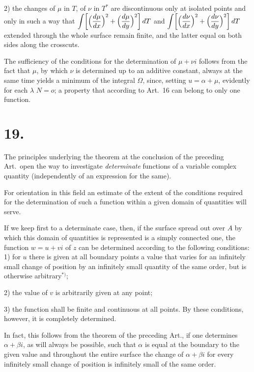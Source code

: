 \documentclass{article}
\begin{document}
2) the changes of $\mu$ in $T$, of $\nu$ in $T^*$ are discontinuous only at isolated points and only in such a way that $\displaystyle\int \biggl[\Bigl(\frac{d\mu}{dx}\Bigr)^2 + \Bigl(\frac{d\mu}{dy}\Bigr)^2\biggr]\,dT$ and $\displaystyle\int \biggl[\Bigl(\frac{d\nu}{dx}\Bigr)^2 + \Bigl(\frac{d\nu}{dy}\Bigr)^2\biggr]\,dT$ extended through the whole surface remain finite, and the latter equal on both sides along the crosscuts.

The sufficiency of the conditions for the determination of $\mu + \nu i$ follows from the fact that $\mu$, by which $\nu$ is determined up to an additive constant, always at the same time yields a minimum of the integral $\Omega$, since, setting $u = \alpha + \mu$, evidently for each $\lambda$ $N = o$; a property that according to Art.~16 can belong to only one function.

\section*{19.}

The principles underlying the theorem at the conclusion of the preceding Art.\ open the way to investigate \emph{determinate} functions of a variable complex quantity (independently of an expression for the same).

For orientation in this field an estimate of the extent of the conditions required for the determination of such a function within a given domain of quantities will serve.

If we keep first to a determinate case, then, if the surface spread out over $A$ by which this domain of quantities is represented is a simply connected one, the function $w = u + vi$ of $z$ can be determined according to the following conditions:
1) for $u$ there is given at all boundary points a value that varies for an infinitely small change of position by an infinitely small quantity of the same order, but is otherwise arbitrary${}^{*)}$;


2) the value of $v$ is arbitrarily given at any point;


3) the function shall be finite and continuous at all points.
By these conditions, however, it is completely determined.

In fact, this follows from the theorem of the preceding Art., if one determines $\alpha + \beta i$, as will always be possible, such that $\alpha$ is equal at the boundary to the given value and throughout the entire surface the change of $\alpha + \beta i$ for every infinitely small change of position is infinitely small of the same order.
\end{document}
